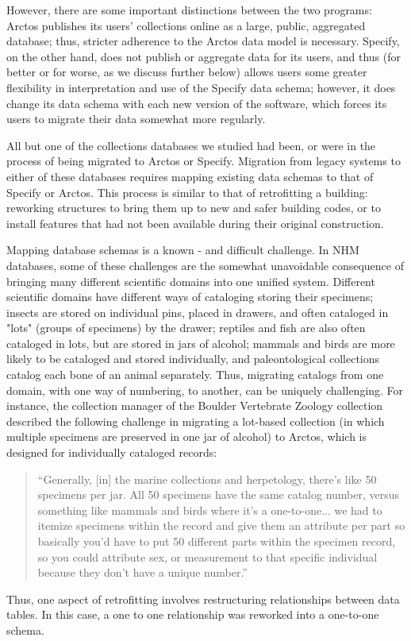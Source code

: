 However, there are some important distinctions between the two programs: Arctos publishes its users’ collections online as a large, public, aggregated database; thus, stricter adherence to the Arctos data model is necessary. Specify, on the other hand, does not publish or aggregate data for its users, and thus (for better or for worse, as we discuss further below) allows users some greater flexibility in interpretation and use of the Specify data schema; however, it does change its data schema with each new version of the software, which forces its users to migrate their data somewhat more regularly.

All but one of the collections databases we studied had been, or were in the process of being migrated to Arctos or Specify. Migration from legacy systems to either of these databases requires mapping existing data schemas to that of Specify or Arctos. This process is similar to that of retrofitting a building: reworking structures to bring them up to new and safer building codes, or to install features that had not been available during their original construction. 

Mapping database schemas is a known - and difficult challenge. In NHM databases, some of these challenges are the somewhat unavoidable consequence of bringing many different scientific domains into one unified system. Different scientific domains have different ways of cataloging storing their specimens; insects are stored on individual pins, placed in drawers, and often cataloged in "lots" (groups of specimens) by the drawer; reptiles and fish are also often cataloged in lots, but are stored in jars of alcohol; mammals and birds are more likely to be cataloged and stored individually, and paleontological collections catalog each bone of an animal separately. Thus, migrating catalogs from one domain, with one way of numbering, to another, can be uniquely challenging. For instance, the collection manager of the Boulder Vertebrate Zoology collection described the following challenge in migrating a lot-based collection (in which multiple specimens are preserved in one jar of alcohol) to Arctos, which is designed for individually cataloged records:
\begin{quote}
“Generally, [in] the marine collections and herpetology, there's like 50 specimens per jar. All 50 specimens have the same catalog number, versus something like mammals and birds where it's a one-to-one... we had to itemize specimens within the record and give them an attribute per part so basically you'd have to put 50 different parts within the specimen record, so you could attribute sex, or measurement to that specific individual because they don't have a unique number.”
\end{quote}
Thus, one aspect of retrofitting involves restructuring relationships between data tables. In this case, a one to one relationship was reworked into a one-to-one schema.

